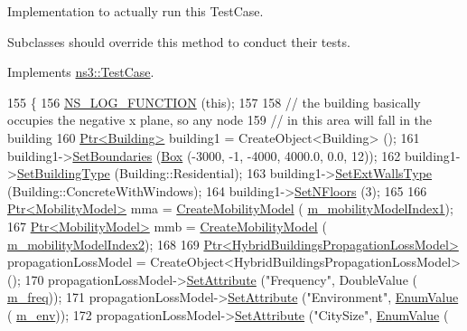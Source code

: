 Implementation to actually run this Test\+Case. 

Subclasses should override this method to conduct their tests. 

Implements \hyperlink{classns3_1_1TestCase_a8ff74680cf017ed42011e4be51917a24}{ns3\+::\+Test\+Case}.


\begin{DoxyCode}
155 \{
156   \hyperlink{log-macros-disabled_8h_a90b90d5bad1f39cb1b64923ea94c0761}{NS\_LOG\_FUNCTION} (\textcolor{keyword}{this});
157 
158   \textcolor{comment}{// the building basically occupies the negative x plane, so any node}
159   \textcolor{comment}{// in this area will fall in the building }
160   \hyperlink{classns3_1_1Ptr}{Ptr<Building>} building1 = CreateObject<Building> ();
161   building1->\hyperlink{classns3_1_1Building_a4b69659f05a983f06e33e7db62415915}{SetBoundaries} (\hyperlink{classns3_1_1Box}{Box} (-3000, -1, -4000, 4000.0, 0.0, 12));
162   building1->\hyperlink{classns3_1_1Building_a2f193ed27d25ed8bf29962d3c7d77204}{SetBuildingType} (Building::Residential);
163   building1->\hyperlink{classns3_1_1Building_a8084b2aafb9ca8bcb775fad0319d42e8}{SetExtWallsType} (Building::ConcreteWithWindows);
164   building1->\hyperlink{classns3_1_1Building_ae9f97075b5c8bf4685703e30ed049791}{SetNFloors} (3);
165   
166   \hyperlink{classns3_1_1Ptr}{Ptr<MobilityModel>} mma = \hyperlink{classBuildingsPathlossTestCase_a22b970340b20ac349830e21a7b6abc6f}{CreateMobilityModel} (
      \hyperlink{classBuildingsPathlossTestCase_aeb1bf5997aa2b647fb373b242882278c}{m\_mobilityModelIndex1});
167   \hyperlink{classns3_1_1Ptr}{Ptr<MobilityModel>} mmb = \hyperlink{classBuildingsPathlossTestCase_a22b970340b20ac349830e21a7b6abc6f}{CreateMobilityModel} (
      \hyperlink{classBuildingsPathlossTestCase_a414f4e3129ea9e835f67007bbb6134b0}{m\_mobilityModelIndex2});
168 
169   \hyperlink{classns3_1_1Ptr}{Ptr<HybridBuildingsPropagationLossModel>} propagationLossModel = 
      CreateObject<HybridBuildingsPropagationLossModel> ();
170   propagationLossModel->\hyperlink{classns3_1_1ObjectBase_ac60245d3ea4123bbc9b1d391f1f6592f}{SetAttribute} (\textcolor{stringliteral}{"Frequency"}, DoubleValue (
      \hyperlink{classBuildingsPathlossTestCase_a90150f4e2d28b5efde2a48ac8c13d3fc}{m\_freq}));
171   propagationLossModel->\hyperlink{classns3_1_1ObjectBase_ac60245d3ea4123bbc9b1d391f1f6592f}{SetAttribute} (\textcolor{stringliteral}{"Environment"}, \hyperlink{classns3_1_1EnumValue}{EnumValue} (
      \hyperlink{classBuildingsPathlossTestCase_abaed00c46ac583663cb48d1ed202a3d8}{m\_env}));
172   propagationLossModel->\hyperlink{classns3_1_1ObjectBase_ac60245d3ea4123bbc9b1d391f1f6592f}{SetAttribute} (\textcolor{stringliteral}{"CitySize"}, \hyperlink{classns3_1_1EnumValue}{EnumValue} (

\end{DoxyCode}
